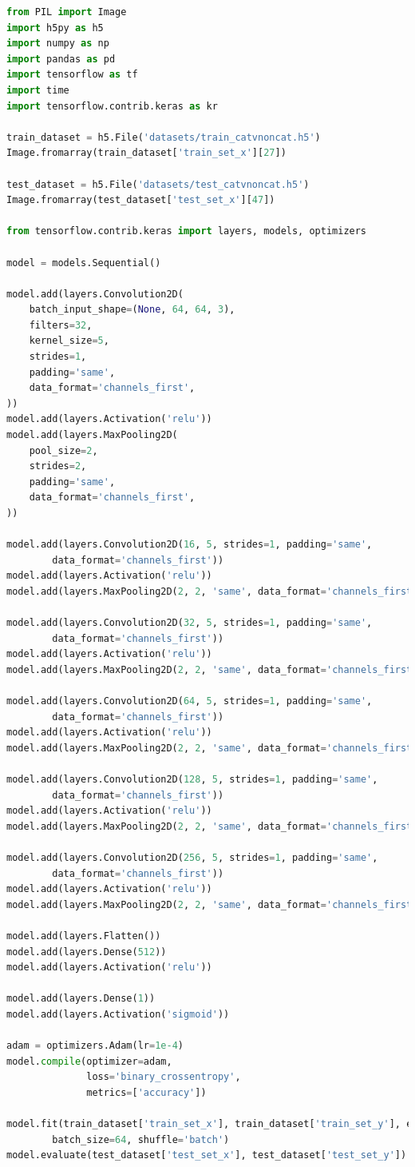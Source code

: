 \documentclass[UTF8]{ctexart}
\begin{document}
\begin{lstlisting}[language=Python]
from PIL import Image
import h5py as h5
import numpy as np
import pandas as pd
import tensorflow as tf
import time
import tensorflow.contrib.keras as kr

train_dataset = h5.File('datasets/train_catvnoncat.h5')
Image.fromarray(train_dataset['train_set_x'][27])

test_dataset = h5.File('datasets/test_catvnoncat.h5')
Image.fromarray(test_dataset['test_set_x'][47])

from tensorflow.contrib.keras import layers, models, optimizers

model = models.Sequential()

model.add(layers.Convolution2D(
    batch_input_shape=(None, 64, 64, 3),
    filters=32,
    kernel_size=5,
    strides=1,
    padding='same',
    data_format='channels_first',
))
model.add(layers.Activation('relu'))
model.add(layers.MaxPooling2D(
    pool_size=2,
    strides=2,
    padding='same',
    data_format='channels_first',
))

model.add(layers.Convolution2D(16, 5, strides=1, padding='same',
        data_format='channels_first'))
model.add(layers.Activation('relu'))
model.add(layers.MaxPooling2D(2, 2, 'same', data_format='channels_first'))

model.add(layers.Convolution2D(32, 5, strides=1, padding='same', 
        data_format='channels_first'))
model.add(layers.Activation('relu'))
model.add(layers.MaxPooling2D(2, 2, 'same', data_format='channels_first'))

model.add(layers.Convolution2D(64, 5, strides=1, padding='same', 
        data_format='channels_first'))
model.add(layers.Activation('relu'))
model.add(layers.MaxPooling2D(2, 2, 'same', data_format='channels_first'))

model.add(layers.Convolution2D(128, 5, strides=1, padding='same', 
        data_format='channels_first'))
model.add(layers.Activation('relu'))
model.add(layers.MaxPooling2D(2, 2, 'same', data_format='channels_first'))

model.add(layers.Convolution2D(256, 5, strides=1, padding='same', 
        data_format='channels_first'))
model.add(layers.Activation('relu'))
model.add(layers.MaxPooling2D(2, 2, 'same', data_format='channels_first'))

model.add(layers.Flatten())
model.add(layers.Dense(512))
model.add(layers.Activation('relu'))

model.add(layers.Dense(1))
model.add(layers.Activation('sigmoid'))

adam = optimizers.Adam(lr=1e-4)
model.compile(optimizer=adam,
              loss='binary_crossentropy',
              metrics=['accuracy'])

model.fit(train_dataset['train_set_x'], train_dataset['train_set_y'], epochs=40, 
        batch_size=64, shuffle='batch')
model.evaluate(test_dataset['test_set_x'], test_dataset['test_set_y'])
\end{lstlisting}
\end{document}
